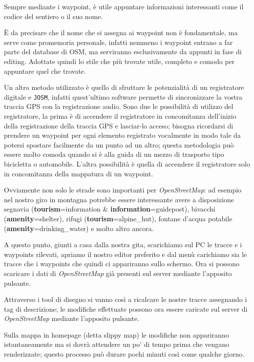 \documentclass[a4paper,twoside,12pt,]{article}
\newcommand{\osm}{\emph{OpenStreetMap}\xspace}
\newcommand{\gps}{GPS\xspace}
\newcommand{\key}[1]{\textsf{\textbf{#1}}}
\newcommand{\val}[1]{\textsf{#1}}
\newcommand{\soft}[1]{\texttt{#1}}
\begin{document}
Sempre mediante i waypoint, è utile appuntare informazioni interessanti come il codice del sentiero o il suo nome.

È da precisare che il nome che si assegna ai waypoint non è fondamentale, ma serve come promemoria personale, infatti nemmeno i waypoint entrano a far parte del database di OSM, ma serviranno esclusivamente da appunti in fase di editing. Adottate quindi lo stile che più trovate utile, completo e comodo per appuntare quel che trovate.

Un altro metodo utilizzato è quello di sfruttare le potenzialità di un registratore digitale e \soft{JOSM}, infatti quest'ultimo software permette di sincronizzare la vostra traccia \gps con la registrazione audio. Sono due le possibilità di utilizzo del registratore, la prima è di accendere il registratore in concomitanza dell'inizio della registrazione della traccia \gps e lasciar-lo acceso; bisogna ricordarsi di prendere un waypoint per ogni elemento registrato vocalmente in modo tale da potersi spostare facilmente da un punto ad un altro; questa metodologia può essere molto comoda quando si è alla guida di un mezzo di trasporto tipo bicicletta o automobile. L'altra possibilità è quella di accendere il registratore solo in concomitanza della mappatura di un waypoint.

Ovviamente non solo le strade sono importanti per \osm: ad esempio nel nostro giro in montagna potrebbe essere interessante avere a disposizione segnavia (\key{tourism}=\val{information} \& \key{information}=\val{guidepost}), bivacchi (\key{amenity}=\val{shelter}), rifugi (\key{tourism}=\val{alpine\_hut}), fontane d'acqua potabile (\key{amenity}=\val{drinking\_water}) e molto altro ancora.

A questo punto, giunti a casa dalla nostra gita, scarichiamo sul PC le tracce e i waypoints rilevati, apriamo il nostro editor preferito e dal menù carichiamo sia le tracce che i waypoints che quindi ci appariranno sullo schermo. Ora si possono scaricare i dati di \osm già presenti sul server mediante l'apposito pulsante.

Attraverso i tool di disegno si vanno così a ricalcare le nostre tracce assegnando i tag di descrizione; le modifiche effettuate possono ora essere caricate sul server di \osm mediante l'apposito pulsante.

Sulla mappa in homepage (detta slippy map) le modifiche non appariranno istantaneamente ma si dovrà attendere un po' di tempo prima che vengano renderizzate; questo processo può durare pochi minuti così come qualche giorno.
\end{document}
